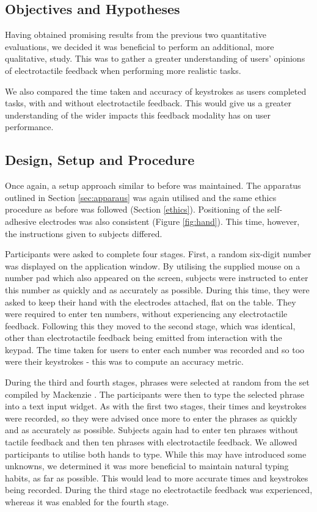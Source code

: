 \documentclass{mpaper}
\begin{document}
\subsection{Objectives and Hypotheses}
Having obtained promising results from the previous two quantitative evaluations, we decided it was beneficial to perform an additional, more qualitative, study. This was to gather a greater understanding of users' opinions of electrotactile feedback when performing more realistic tasks.

We also compared the time taken and accuracy of keystrokes as users completed tasks, with and without electrotactile feedback. This would give us a greater understanding of the wider impacts this feedback modality has on user performance.

\subsection{Design, Setup and Procedure}
Once again, a setup approach similar to before was maintained. The apparatus outlined in Section \ref{sec:apparaus} was again utilised and the same ethics procedure as before was followed (Section \ref{ethics}). Positioning of the self-adhesive electrodes was also consistent (Figure \ref{fig:hand}). This time, however, the instructions given to subjects differed. 

Participants were asked to complete four stages. First, a random six-digit number was displayed on the application window. By utilising the supplied mouse on a number pad which also appeared on the screen, subjects were instructed to enter this number as quickly and as accurately as possible. During this time, they were asked to keep their hand with the electrodes attached, flat on the table. They were required to enter ten numbers, without experiencing any electrotactile feedback. Following this they moved to the second stage, which was identical, other than electrotactile feedback being emitted from interaction with the keypad. The time taken for users to enter each number was recorded and so too were their keystrokes - this was to compute an accuracy metric.

During the third and fourth stages, phrases were selected at random from the set compiled by Mackenzie \cite{phrases_dataset}. The participants were then to type the selected phrase into a text input widget. As with the first two stages, their times and keystrokes were recorded, so they were advised once more to enter the phrases as quickly and as accurately as possible. Subjects again had to enter ten phrases without tactile feedback and then ten phrases with electrotactile feedback. We allowed participants to utilise both hands to type. While this may have introduced some unknowns, we determined it was more beneficial to maintain natural typing habits, as far as possible. This would lead to more accurate times and keystrokes being recorded. During the third stage no electrotactile feedback was experienced, whereas it was enabled for the fourth stage.
\end{document}
